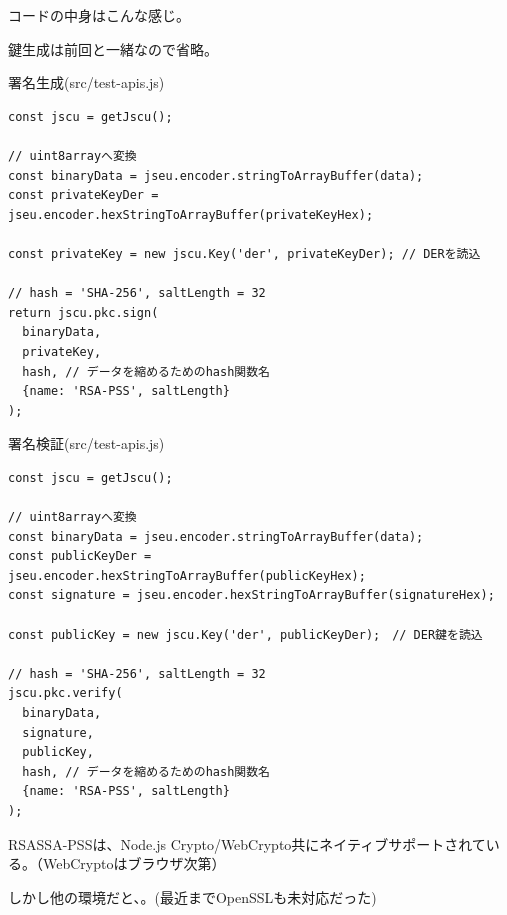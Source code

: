 \documentclass[12pt,dvipdfmx]{beamer}
\begin{document}
\begin{frame}[fragile]
コードの中身はこんな感じ。

鍵生成は前回と一緒なので省略。


\begin{block}{\small 署名生成(src/test-apis.js)}
\scriptsize
\begin{verbatim}
const jscu = getJscu();

// uint8arrayへ変換
const binaryData = jseu.encoder.stringToArrayBuffer(data);
const privateKeyDer = jseu.encoder.hexStringToArrayBuffer(privateKeyHex);

const privateKey = new jscu.Key('der', privateKeyDer); // DERを読込

// hash = 'SHA-256', saltLength = 32
return jscu.pkc.sign(
  binaryData,
  privateKey,
  hash, // データを縮めるためのhash関数名
  {name: 'RSA-PSS', saltLength}
);
\end{verbatim}
\end{block}
\end{frame}

\begin{frame}[fragile]

\begin{block}{\small 署名検証(src/test-apis.js)}
\scriptsize
\begin{verbatim}
const jscu = getJscu();

// uint8arrayへ変換
const binaryData = jseu.encoder.stringToArrayBuffer(data);
const publicKeyDer = jseu.encoder.hexStringToArrayBuffer(publicKeyHex);
const signature = jseu.encoder.hexStringToArrayBuffer(signatureHex);

const publicKey = new jscu.Key('der', publicKeyDer);　// DER鍵を読込

// hash = 'SHA-256', saltLength = 32
jscu.pkc.verify(
  binaryData,
  signature,
  publicKey,
  hash, // データを縮めるためのhash関数名
  {name: 'RSA-PSS', saltLength}
); 
\end{verbatim}
\end{block}

\end{frame}

\begin{frame}
RSASSA-PSSは、Node.js Crypto/WebCrypto共にネイティブサポートされている。（WebCryptoはブラウザ次第）

しかし他の環境だと、。(最近までOpenSSLも未対応だった)
\end{frame}
\end{document}
